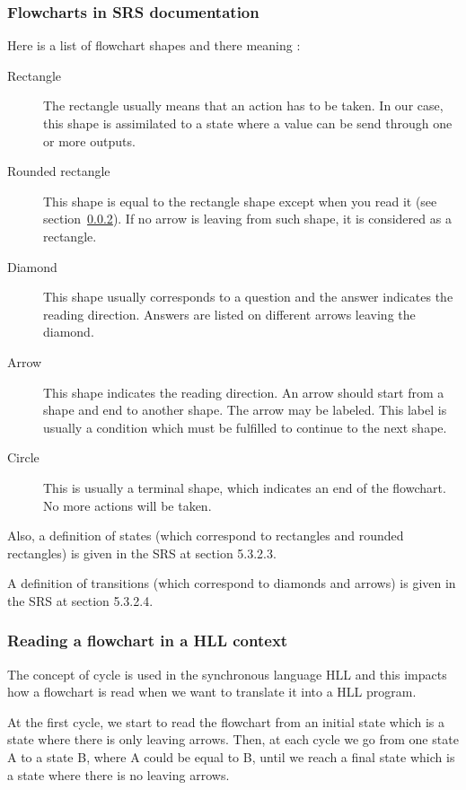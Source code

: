 \subsubsection{Flowcharts in SRS documentation}
\label{flowchart-definition}
Here is a list of flowchart shapes and there meaning :
\begin{description}
\item[Rectangle] The rectangle usually means that an action has to be
  taken. In our case, this shape is assimilated to a state where a
  value can be send through one or more outputs.
\item[Rounded rectangle] This shape is equal to the rectangle shape
  except when you read it (see section~\ref{reading-a-flowchart}). If
  no arrow is leaving from such shape, it is considered as a
  rectangle.
\item[Diamond] This shape usually corresponds to a question and the
  answer indicates the reading direction. Answers are listed on
  different arrows leaving the diamond.
\item[Arrow] This shape indicates the reading direction. An arrow
  should start from a shape and end to another shape. The arrow may be
  labeled. This label is usually a condition which must be fulfilled
  to continue to the next shape.
\item[Circle] This is usually a terminal shape, which indicates an end
  of the flowchart. No more actions will be taken.
\end{description}

Also, a definition of states (which correspond to rectangles and
rounded rectangles) is given in the SRS at section 5.3.2.3.

A definition of transitions (which correspond to diamonds and arrows)
is given in the SRS at section 5.3.2.4.

\subsubsection{Reading a flowchart in a HLL context}
\label{reading-a-flowchart}
The concept of cycle is used in the synchronous language HLL and this
impacts how a flowchart is read when we want to translate it into a
HLL program.

At the first cycle, we start to read the flowchart from an initial
state which is a state where there is only leaving arrows. Then, at
each cycle we go from one state A to a state B, where A could be equal
to B, until we reach a final state which is a state where there is no
leaving arrows.

